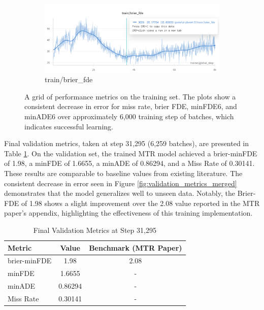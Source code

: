 \begin{figure}[htbp]
\begin{subfigure}[b]{0.48\textwidth}
        \centering
        \includegraphics[clip, width=\textwidth]{figures/train_brier_fde.png}
        \caption{train/brier\_fde}
    \end{subfigure}
    \caption{A grid of performance metrics on the training set. The plots show a consistent decrease in error for miss rate, brier FDE, minFDE6, and minADE6 over approximately 6,000 training step of batches, which indicates successful learning. }
    \label{fig:training_metrics_grid_merged}
\end{figure}

Final validation metrics, taken at step 31,295 (6,259 batches), are presented in Table \ref{tab:validation_results}.  On the validation set, the trained MTR model achieved a brier-minFDE of 1.98, a minFDE of 1.6655, a minADE of 0.86294, and a Miss Rate of 0.30141.  These results are comparable to baseline values from existing literature.  The consistent decrease in error seen in Figure \ref{fig:validation_metrics_merged} demonstrates that the model generalizes well to unseen data.  Notably, the Brier-FDE of 1.98 shows a slight improvement over the 2.08 value reported in the MTR paper's appendix, highlighting the effectiveness of this training implementation. 

\begin{table}[htbp]
    \centering
    \caption{Final Validation Metrics at Step 31,295}
    \label{tab:validation_results}
    \begin{tabular}{@{}lcc@{}}
        \toprule
        \textbf{Metric} & \textbf{Value} & \textbf{Benchmark (MTR Paper)} \\
        \midrule
        brier-minFDE & 1.98  & 2.08  \\
        minFDE & 1.6655  & - \\
        minADE & 0.86294  & - \\
        Miss Rate & 0.30141  & - \\
        \bottomrule
    \end{tabular}
\end{table}

